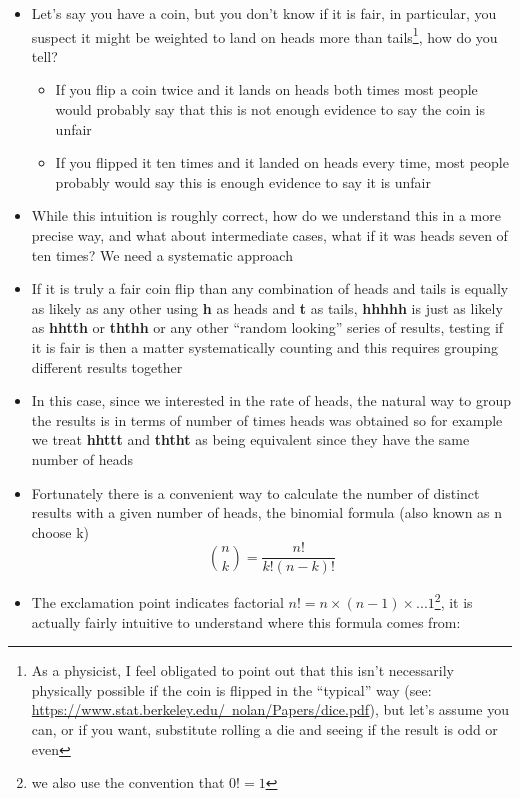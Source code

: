 \documentclass[english]{article}
\begin{document}
\begin{itemize}
\item Let's say you have a coin, but you don't know if it is fair, in particular, you suspect it might be weighted to land on heads more than tails\footnote{As a physicist, I feel obligated to point out that this isn't necessarily physically possible if the coin is flipped in the ``typical'' way (see: \href{https://www.stat.berkeley.edu/~nolan/Papers/dice.pdf}{https://www.stat.berkeley.edu/~nolan/Papers/dice.pdf}), but let's assume you can, or if you want, substitute rolling a die and seeing if the result is odd or even}, how do you tell?
\begin{itemize}
\item If you flip a coin twice and it lands on heads both times most people would probably say that this is not enough evidence to say the coin is unfair
\item If you flipped it ten times and it landed on heads every time, most people probably would say this is enough evidence to say it is unfair
\end{itemize}
\item While this intuition is roughly correct, how do we understand this in a more precise way, and what about intermediate cases, what if it was heads seven of ten times? We need a systematic approach
\item If it is truly a fair coin flip than any combination of heads and tails is equally as likely as any other using \textbf{h} as heads and \textbf{t} as tails, \textbf{hhhhh} is just as likely as \textbf{hhtth} or \textbf{ththh} or any other ``random looking'' series of results, testing if it is fair is then a matter systematically counting and this requires grouping different results together
\item In this case, since we interested in the rate of heads, the natural way to group the results is in terms of number of times heads was obtained so for example we treat \textbf{hhttt} and \textbf{ththt} as being equivalent since they have the same number of heads
\item Fortunately there is a convenient way to calculate the number of distinct results with a given number of heads, the binomial formula (also known as n choose k)
\begin{equation}
\binom{n}{k}=\frac{n!}{k!(n-k)!}
\end{equation} 
\item The exclamation point indicates factorial $n!=n\times (n-1) \times ... 1$\footnote{we also use the convention that $0!=1$}, it is actually fairly intuitive to understand where this formula comes from:

\end{itemize}
\end{document}
